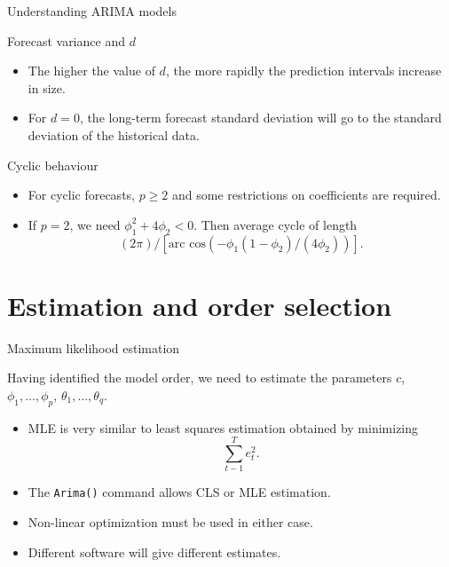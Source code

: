 \documentclass[14pt,ignorenonframetext,]{beamer}
\providecommand{\tightlist}{%
  \setlength{\itemsep}{0pt}\setlength{\parskip}{0pt}}
\begin{document}
\begin{frame}{Understanding ARIMA models}

\fontsize{14}{15.5}\sf

\begin{block}{Forecast variance and \(d\)}

\begin{itemize}
\tightlist
\item
  The higher the value of \(d\), the more rapidly the prediction
  intervals increase in size.
\item
  For \(d=0\), the long-term forecast standard deviation will go to the
  standard deviation of the historical data.
\end{itemize}

\end{block}

\begin{block}{Cyclic behaviour}

\begin{itemize}
\tightlist
\item
  For cyclic forecasts, \(p\ge2\) and some restrictions on coefficients
  are required.
\item
  If \(p=2\), we need \(\phi_1^2+4\phi_2<0\). Then average cycle of
  length \[
    (2\pi)/\left[\text{arc cos}(-\phi_1(1-\phi_2)/(4\phi_2))\right].
  \]
\end{itemize}

\end{block}

\end{frame}

\section{Estimation and order
selection}\label{estimation-and-order-selection}

\begin{frame}[fragile]{Maximum likelihood estimation}

Having identified the model order, we need to estimate the parameters
\(c\), \(\phi_1,\dots,\phi_p\), \(\theta_1,\dots,\theta_q\).\pause

\begin{itemize}
\tightlist
\item
  MLE is very similar to least squares estimation obtained by minimizing
  \[\sum_{t-1}^T e_t^2.\]
\item
  The \texttt{Arima()} command allows CLS or MLE estimation.
\item
  Non-linear optimization must be used in either case.
\item
  Different software will give different estimates.
\end{itemize}

\end{frame}
\end{document}
